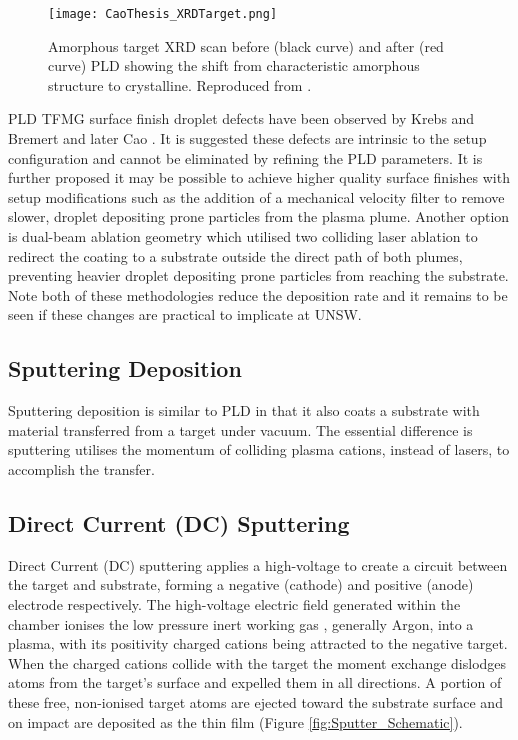 \documentclass[a4paper,12pt,oneside]{report}%
\begin{document}
\begin{figure}[htbp]
	\centering
	\texttt{[image: CaoThesis\_XRDTarget.png]}
	\caption{Amorphous target XRD scan before (black curve) and after (red curve) PLD showing the shift from characteristic amorphous structure to crystalline. Reproduced from \cite{Cao2013}.}
	\label{fig:ReCryTarget}
\end{figure}

PLD TFMG surface finish droplet defects have been observed by Krebs and Bremert \cite{Krebs1993} and later Cao \cite{Cao2013}. It is suggested these defects are intrinsic to the setup configuration and cannot be eliminated by refining the PLD parameters. It is further proposed it may be possible to achieve higher quality surface finishes with setup modifications such as the addition of a mechanical velocity filter to remove slower, droplet depositing prone particles from the plasma plume. Another option is dual-beam ablation geometry which utilised two colliding laser ablation to redirect the coating to a substrate outside the direct path of both plumes, preventing heavier droplet depositing prone particles from reaching the substrate. Note both of these methodologies reduce the deposition rate and it remains to be seen if these changes are practical to implicate at UNSW.

\subsection{Sputtering Deposition}
Sputtering deposition is similar to PLD in that it also coats a substrate with material transferred from a target under vacuum. The essential difference is sputtering utilises the momentum of colliding plasma cations, instead of lasers, to accomplish the transfer. 

\subsection{Direct Current (DC) Sputtering} 
Direct Current (DC) sputtering applies a high-voltage to create a circuit between the target and substrate, forming a negative (cathode) and positive (anode) electrode respectively. The high-voltage electric field generated within the chamber ionises the low pressure inert working gas , generally Argon, into a plasma, with its positivity charged cations being attracted to the negative target. When the charged cations collide with the target the moment exchange dislodges atoms from the target's surface and expelled them in all directions. A portion of these free, non-ionised target atoms are ejected toward the substrate surface and on impact are deposited as the thin film (Figure \ref{fig:Sputter_Schematic}).
\end{document}
